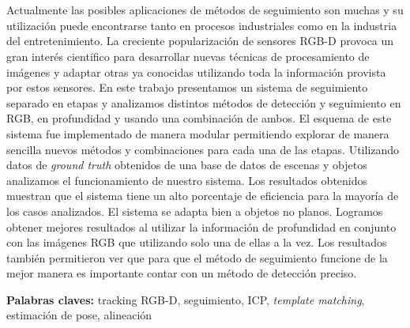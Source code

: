 \chapter*{\runtitulo}

\noindent Actualmente las posibles aplicaciones de métodos de seguimiento son muchas y su utilización puede encontrarse tanto en procesos industriales como en la industria del entretenimiento. La creciente popularización de sensores RGB-D provoca un gran interés científico para desarrollar nuevas técnicas de procesamiento de imágenes y adaptar otras ya conocidas utilizando toda la información provista por estos sensores. En este trabajo presentamos un sistema de seguimiento separado en etapas y analizamos distintos métodos de detección y seguimiento en RGB, en profundidad y usando una combinación de ambos. El esquema de este sistema fue implementado de manera modular permitiendo explorar de manera sencilla nuevos métodos y combinaciones para cada una de las etapas. Utilizando datos de \textit{ground truth} obtenidos de una base de datos de escenas y objetos analizamos el funcionamiento de nuestro sistema. Los resultados obtenidos muestran que el sistema tiene un alto porcentaje de eficiencia para la mayoría de los casos analizados. El sistema se adapta bien a objetos no planos. Logramos obtener mejores resultados al utilizar la información de profundidad en conjunto con las imágenes RGB que utilizando solo una de ellas a la vez. Los resultados también permitieron ver que para que el método de seguimiento funcione de la mejor manera es importante contar con un método de detección preciso.



\bigskip

\noindent\textbf{Palabras claves:} tracking RGB-D, seguimiento, ICP, \textit{template matching}, estimación de pose, alineación
